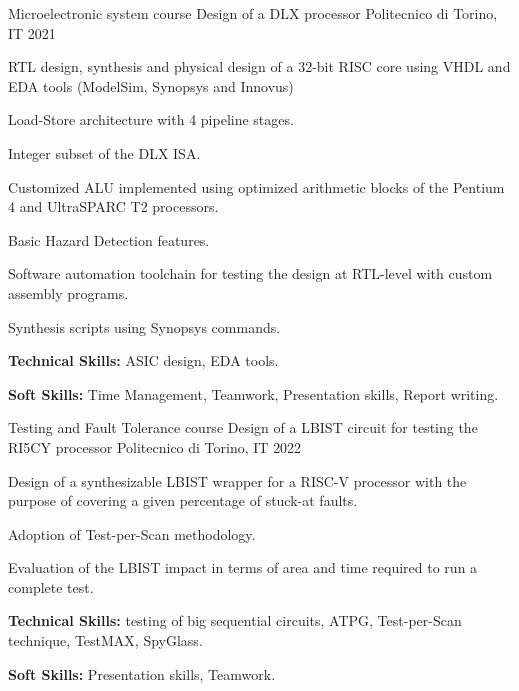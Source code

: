 

\begin{cventries}

  \cventry
    {Microelectronic system course} %
    {Design of a DLX processor} %
    {Politecnico di Torino, IT} %
    {2021} %
    {
      \begin{cvitems} %
        \item{RTL design, synthesis and physical design of a 32-bit RISC core using VHDL and EDA tools (ModelSim, Synopsys and Innovus)}
        \item {Load-Store architecture with 4 pipeline stages.}
        \item {Integer subset of the DLX ISA.}
        \item {Customized ALU implemented using optimized arithmetic blocks of the Pentium 4 and UltraSPARC T2 processors.}
        \item {Basic Hazard Detection features.}
        \item {Software automation toolchain for testing the design at RTL-level with custom assembly programs.}
        \item {Synthesis scripts using Synopsys commands.}
        \item {\textbf{Technical Skills:} ASIC design, EDA tools.}
        \item {\textbf{Soft Skills:} Time Management, Teamwork, Presentation skills, Report writing.}
      \end{cvitems}
    }


  \cventry
    {Testing and Fault Tolerance course} %
    {Design of a LBIST circuit for testing the RI5CY processor} %
    {Politecnico di Torino, IT} %
    {2022} %
    {
      \begin{cvitems} %
        \item{Design of a synthesizable LBIST wrapper for a RISC-V processor with the purpose of covering a given percentage of stuck-at faults}.
        \item{Adoption of Test-per-Scan methodology.}
        \item {Evaluation of the LBIST impact in terms of area and time required to run a complete test.}
        \item {\textbf{Technical Skills:} testing of big sequential circuits, ATPG, Test-per-Scan technique, TestMAX, SpyGlass.}
        \item {\textbf{Soft Skills:} Presentation skills, Teamwork.}
      \end{cvitems}
    }


\end{cventries}
